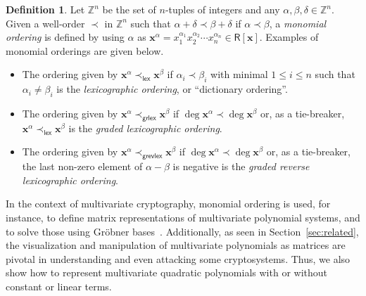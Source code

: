 \documentclass[english]{ufsc-thesis-rn46-2019/ufsc-thesis-rn46-2019}
\theoremstyle{definition}
\newtheorem{definition}[theorem]{Definition}
\begin{document}
\begin{definition}
  Let $\mathbb{Z}^{n}$ be the set of $n$-tuples of integers and any
  $\alpha, \beta, \delta \in \mathbb{Z}^{n}$. Given a well-order $\prec$ in
  $\mathbb{Z}^{n}$ such that $\alpha + \delta \prec \beta + \delta$ if
  $\alpha \prec \beta$, a \emph{monomial ordering} is defined by using $\alpha$
  as
  $\mathbf{x}^{\alpha}
    = x_{1}^{\alpha_{1}} x_{2}^{\alpha_{2}} \cdots x_{n}^{\alpha_{n}}
      \in \mathsf{R}[\mathbf{x}]$.
  Examples of monomial orderings are given below.

  \begin{itemize}
    \item The ordering given by
      $\mathbf{x}^{\alpha} \prec_{\mathsf{lex}} \mathbf{x}^{\beta}$
      if $\alpha_{i} \prec \beta_{i}$ with minimal $1 \leq i \leq n$ such that
      $\alpha_{i} \neq \beta_{i}$ is the \emph{lexicographic ordering}, or
      ``dictionary ordering''.
    \item The ordering given by
      $\mathbf{x}^{\alpha} \prec_{\mathsf{grlex}} \mathbf{x}^{\beta}$
      if $\deg \mathbf{x}^{\alpha} \prec \deg \mathbf{x}^{\beta}$ or, as a
      tie-breaker,
      $\mathbf{x}^{\alpha} \prec_{\mathsf{lex}} \mathbf{x}^{\beta}$ is the
      \emph{graded lexicographic ordering}.
    \item The ordering given by
      $\mathbf{x}^{\alpha} \prec_{\mathsf{grevlex}} \mathbf{x}^{\beta}$
      if $\deg \mathbf{x}^{\alpha} \prec \deg \mathbf{x}^{\beta}$ or, as a
      tie-breaker, the last non-zero element of $\alpha - \beta$ is negative is
      the \emph{graded reverse lexicographic ordering}.
  \end{itemize}
\end{definition}

In the context of multivariate cryptography, monomial ordering is used, for
instance, to define matrix representations of multivariate polynomial systems,
and to solve those using Gröbner
bases~\cite[Sec.~21.4]{Gathen:2013}. Additionally, as seen in
Section~\ref{sec:related}, the visualization and manipulation of multivariate
polynomials as matrices are pivotal in understanding and even attacking some
cryptosystems. Thus, we also show how to represent multivariate quadratic
polynomials with or without constant or linear terms.
\end{document}
